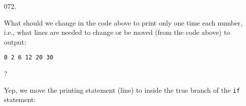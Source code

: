 \documentclass[]{book}
\newenvironment{Shaded}{}{}
\newcommand{\BuiltInTok}[1]{#1}
\newcommand{\ControlFlowTok}[1]{\textcolor[rgb]{0.00,0.44,0.13}{\textbf{#1}}}
\newcommand{\DataTypeTok}[1]{\textcolor[rgb]{0.56,0.13,0.00}{#1}}
\newcommand{\DecValTok}[1]{\textcolor[rgb]{0.25,0.63,0.44}{#1}}
\newcommand{\NormalTok}[1]{#1}
\newcommand{\StringTok}[1]{\textcolor[rgb]{0.25,0.44,0.63}{#1}}
\begin{document}
\begin{minipage}{\linewidth}\noindent
{\tiny 072.}\\
\begin{minipage}[t]{.485\linewidth}

What should we change in the code above to print only one time each
number, i.e., what lines are needed to change or be moved (from the code
above) to output:

\begin{framed}

\begin{verbatim}
0 2 6 12 20 30 
\end{verbatim}

\end{framed}

?

\end{minipage}
\hfill
\begin{minipage}[t]{.485\linewidth}

Yep, we move the printing statement (line) to inside the true branch of
the \texttt{if} statement:

\begin{framed}

\begin{Shaded}
\end{Shaded}

\end{framed}

\end{minipage}
\end{minipage}

\vspace{2mm}\noindent\hrulefill{}
\end{document}
